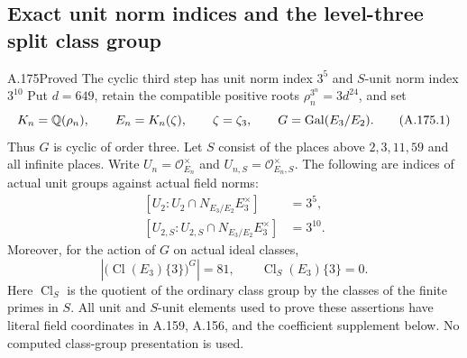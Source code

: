 \subsection{Exact unit norm indices and the level-three split class group}

\begin{statement}{A.175}{Proved}
{The cyclic third step has unit norm index $3^5$ and $S$-unit norm index $3^{10}$}
Put $d=649$, retain the compatible positive roots
$\rho_n^{3^n}=3d^{24}$, and set
\[
 K_n=\mathbb Q(\rho_n),\qquad E_n=K_n(\zeta),\qquad
 \zeta=\zeta_3,\qquad G=\operatorname{Gal}(E_3/E_2).
\tag{A.175.1}
\]
Thus $G$ is cyclic of order three.  Let $S$ consist of the places above
$2,3,11,59$ and all infinite places.  Write $U_n=\mathcal O_{E_n}^{\times}$
and $U_{n,S}=\mathcal O_{E_n,S}^{\times}$.  The following are indices of
actual unit groups against actual field norms:
\[
 \begin{split}
 [U_2:U_2\cap N_{E_3/E_2}E_3^\times]&=3^5,\\
 [U_{2,S}:U_{2,S}\cap N_{E_3/E_2}E_3^\times]&=3^{10}.
 \end{split}
\tag{A.175.2}
\]
Moreover, for the action of $G$ on actual ideal classes,
\[
 \left|\bigl(\operatorname{Cl}(E_3)\{3\}\bigr)^G\right|=81,
 \qquad \operatorname{Cl}_S(E_3)\{3\}=0.
\tag{A.175.3}
\]
Here $\operatorname{Cl}_S$ is the quotient of the ordinary class group
by the classes of the finite primes in $S$.  All unit and $S$-unit
elements used to prove these assertions have literal field coordinates
in A.159, A.156, and the coefficient supplement below.  No computed
class-group presentation is used.
\end{statement}

